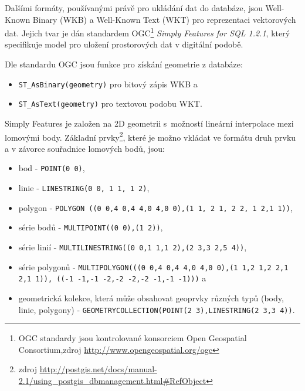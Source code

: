 Dalšími formáty, používanými právě pro ukládání dat do databáze, jsou Well-Known Binary (WKB) a Well-Known Text (WKT) pro reprezentaci vektorových dat. Jejich tvar je dán standardem OGC\footnote{OGC standardy jsou kontrolované konsorciem Open Geospatial Consortium,\newline zdroj \url{http://www.opengeospatial.org/ogc}} {\it Simply Features for SQL 1.2.1}, který specifikuje model pro uložení prostorových dat v digitální podobě. 

Dle standardu OGC jsou funkce pro získání geometrie z databáze:
\begin{itemize}
\item \texttt{ST\_AsBinary(geometry)} pro bitový zápis WKB a
\item \texttt{ST\_AsText(geometry)} pro textovou podobu WKT.
     \end{itemize}

Simply Features je založen na 2D geometrii s~možností lineární interpolace mezi lomovými body. Základní prvky\footnote{zdroj \url {http://postgis.net/docs/manual-2.1/using\_postgis\_dbmanagement.html\#RefObject}}, které je možno vkládat ve formátu druh prvku a v závorce souřadnice lomových bodů, jsou:
\begin{itemize}
\item bod - \texttt{POINT(0 0)},
\item linie - \texttt{LINESTRING(0 0, 1 1, 1 2)},
\item polygon - \texttt{POLYGON ((0 0,4 0,4 4,0 4,0 0),(1 1, 2 1, 2 2, 1 2,1 1))},
\item série bodů - \texttt{MULTIPOINT((0 0),(1 2))},
\item série linií - \texttt{MULTILINESTRING((0 0,1 1,1 2),(2 3,3 2,5 4))},
\item série polygonů - \texttt{MULTIPOLYGON(((0 0,4 0,4 4,0 4,0 0),(1 1,2 1,2 2,1 2,1 1)), ((-1 -1,-1 -2,-2 -2,-2 -1,-1 -1)))} a
\item geometrická kolekce, která může obsahovat geoprvky různých typů (body, linie, polygony) - \texttt{GEOMETRYCOLLECTION(POINT(2 3),LINESTRING(2 3,3 4))}.
\end{itemize}

